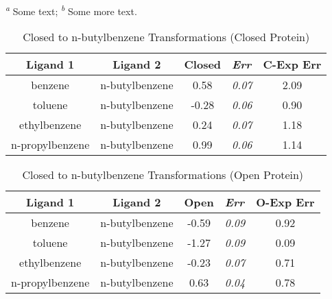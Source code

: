 \documentclass[T4paper.tex]{subfiles}
\begin{document}
\begin{table}[!htb]
  \textsuperscript{\emph{a}} Some text;
  \textsuperscript{\emph{b}} Some more text.
\end{table}

\begin{table}[!htb]
\centering
\caption{Closed to n-butylbenzene Transformations (Closed Protein)}
\label{tbl:C-nbutyl_closed}
\begin{tabular}{|c|c|c|l|c|}
\hline
\textbf{Ligand 1}                       & \textbf{Ligand 2}                      & {\color[HTML]{800080} \textbf{Closed}} & {\color[HTML]{800080} \textit{Err}} & \textbf{C-Exp Err}           \\ \hline
\cellcolor[HTML]{800080}benzene         & \cellcolor[HTML]{00FFFF}n-butylbenzene & 0.58                                   & \textit{0.07}                       & \cellcolor[HTML]{FFCCC9}2.09 \\ \hline
\cellcolor[HTML]{800080}toluene         & \cellcolor[HTML]{00FFFF}n-butylbenzene & -0.28                                  & \textit{0.06}                       & \cellcolor[HTML]{9AFF99}0.90 \\ \hline
\cellcolor[HTML]{800080}ethylbenzene    & \cellcolor[HTML]{00FFFF}n-butylbenzene & 0.24                                   & \textit{0.07}                       & \cellcolor[HTML]{FFCCC9}1.18 \\ \hline
\cellcolor[HTML]{800080}n-propylbenzene & \cellcolor[HTML]{00FFFF}n-butylbenzene & 0.99                                   & \textit{0.06}                       & \cellcolor[HTML]{FFCCC9}1.14 \\ \hline
\end{tabular}
\end{table}

\begin{table}[!htb]
\centering
\caption{Closed to n-butylbenzene Transformations (Open Protein)}
\label{tbl:C-nbutyl_open}
\begin{tabular}{|c|c|c|l|c|}
\hline
\textbf{Ligand 1}                       & \textbf{Ligand 2}                      & {\color[HTML]{008000} \textbf{Open}} & {\color[HTML]{008000} \textit{Err}} & \textbf{O-Exp Err}           \\ \hline
\cellcolor[HTML]{800080}benzene         & \cellcolor[HTML]{00FFFF}n-butylbenzene & -0.59                                & \textit{0.09}                       & \cellcolor[HTML]{9AFF99}0.92 \\ \hline
\cellcolor[HTML]{800080}toluene         & \cellcolor[HTML]{00FFFF}n-butylbenzene & -1.27                                & \textit{0.09}                       & \cellcolor[HTML]{9AFF99}0.09 \\ \hline
\cellcolor[HTML]{800080}ethylbenzene    & \cellcolor[HTML]{00FFFF}n-butylbenzene & -0.23                                & \textit{0.07}                       & \cellcolor[HTML]{9AFF99}0.71 \\ \hline
\cellcolor[HTML]{800080}n-propylbenzene & \cellcolor[HTML]{00FFFF}n-butylbenzene & 0.63                                 & \textit{0.04}                       & \cellcolor[HTML]{9AFF99}0.78 \\ \hline
\end{tabular}
\end{table}
\end{document}
